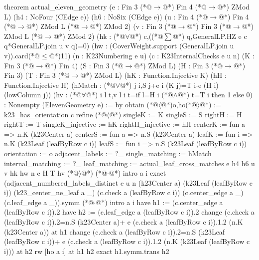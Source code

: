 theorem actual_eleven_geometry (e : Fin 3 (*@$\to$@*) Fin 4 (*@$\to$@*) ZMod L)
    (h4 : NoFour (CEdge e)) (h6 : NoSix (CEdge e))
    (u : Fin 4 (*@$\to$@*) Fin 4 (*@$\to$@*) ZMod L (*@$\to$@*) ZMod 2)
    (v : Fin 3 (*@$\to$@*) Fin 3 (*@$\to$@*) ZMod L (*@$\to$@*) ZMod 2)
    (hk : (*@$\forall$@*) c,((*@$\sum$@*) q,GeneralLP.HZ e c q*GeneralLP.join u v q)=0)
    (hw : (CoverWeight.support (GeneralLP.join u v)).card(*@$\le$@*)11)
    (n : K23Numbering e u) (c : K23InternalChecks e u n)
    (K : Fin 3 (*@$\to$@*) Fin 4) (S : Fin 3 (*@$\to$@*) ZMod L) (H : Fin 3 (*@$\to$@*) Fin 3) (T : Fin 3 (*@$\to$@*) ZMod L)
    (hK : Function.Injective K) (hH : Function.Injective H)
    (hMatch : (*@$\forall$@*) j i,S j+e i (K j)=T i-e (H i) (lowColumn j))
    (hv : (*@$\forall$@*) i l t,v l i t=if l=H i (*@$\land$@*) t=T i then 1 else 0) : Nonempty (ElevenGeometry e) := by
  obtain (*@$\langle$@*)o,ho(*@$\rangle$@*) := k23_has_orientation c
  refine (*@$\langle$@*){
    singleK := K
    singleS := S
    rightH := H
    rightT := T
    singleK_injective := hK
    rightH_injective := hH
    centerK := fun a => n.K (k23Center a)
    centerS := fun a => n.S (k23Center a)
    leafK := fun i => n.K (k23Leaf (leafByRow c i))
    leafS := fun i => n.S (k23Leaf (leafByRow c i))
    orientation := o
    adjacent_labels := ?_
    single_matching := hMatch
    internal_matching := ?_
    leaf_matching := actual_leaf_cross_matches e h4 h6 u v hk hw n c H T hv
  }(*@$\rangle$@*)
  (*@$\cdot$@*) intro a i
    exact (adjacent_numbered_labels_distinct e u n (k23Center a) (k23Leaf (leafByRow c i))
      (k23_center_ne_leaf a _) (c.check a (leafByRow c i))
      (c.center_edge a _) (c.leaf_edge a _)).symm
  (*@$\cdot$@*) intro a i
    have h1 := (c.center_edge a (leafByRow c i)).2
    have h2 := (c.leaf_edge a (leafByRow c i)).2
    change (c.check a (leafByRow c i)).2=n.S (k23Center a)+
      e (c.check a (leafByRow c i)).1.2 (n.K (k23Center a)) at h1
    change (c.check a (leafByRow c i)).2=n.S (k23Leaf (leafByRow c i))+
      e (c.check a (leafByRow c i)).1.2 (n.K (k23Leaf (leafByRow c i))) at h2
    rw [ho a i] at h1 h2
    exact h1.symm.trans h2
